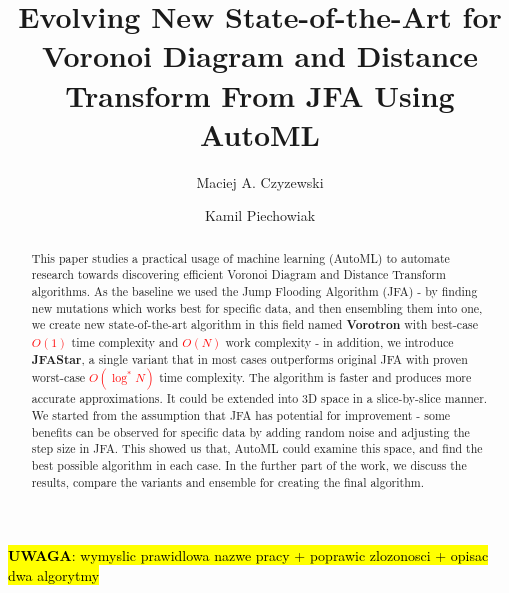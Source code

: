 \documentclass[format=acmsmall,screen,review,authordraft,nonacm]{acmart}
\title{Evolving New State-of-the-Art for Voronoi Diagram and Distance Transform From JFA Using AutoML}
\author{Maciej A. Czyzewski}
\affiliation{%
 \department{Institute of Computing Science}
 \institution{Poznan University of Technology}
 \city{Poznan}
 \country{Poland}}
\author{Kamil Piechowiak}
\affiliation{%
 \department{Institute of Computing Science}
 \institution{Poznan University of Technology}
 \city{Poznan}
 \country{Poland}}
\newcommand{\ourjfasingle}{JFAStar}
\newcommand{\ourjfa}{Vorotron} %
\begin{document}


\hl{\textbf{UWAGA}: wymyslic prawidlowa nazwe pracy + poprawic zlozonosci +
opisac dwa algorytmy}

\begin{abstract}
This paper studies a practical usage of machine learning (AutoML) to automate
research towards discovering efficient Voronoi Diagram and Distance
Transform algorithms.  As the baseline we used the Jump Flooding Algorithm
(JFA) - by finding new mutations which works best for specific data, and
then ensembling them into one, we create new state-of-the-art algorithm in
this field named \textbf{\ourjfa} \hspace{0.01cm} with best-case
\textcolor{red}{$O(1)$} time complexity and \textcolor{red}{$O(N)$} work
complexity - in addition, we introduce \textbf{\ourjfasingle}, a single
variant that in most cases outperforms original JFA with proven worst-case
\textcolor{red}{$O(\log^{*}N)$} time complexity.
The algorithm is faster and produces more accurate approximations. It could be
extended into 3D space in a slice-by-slice manner.  We started from the
assumption that JFA has potential for improvement - some benefits can be
observed for specific data by adding random noise and adjusting the step size in
JFA.  This showed us that, AutoML could examine this space, and find the best
possible algorithm in each case.  In the further part of the work, we discuss
the results, compare the variants and ensemble for creating the final algorithm.
\end{abstract}


\end{document}
